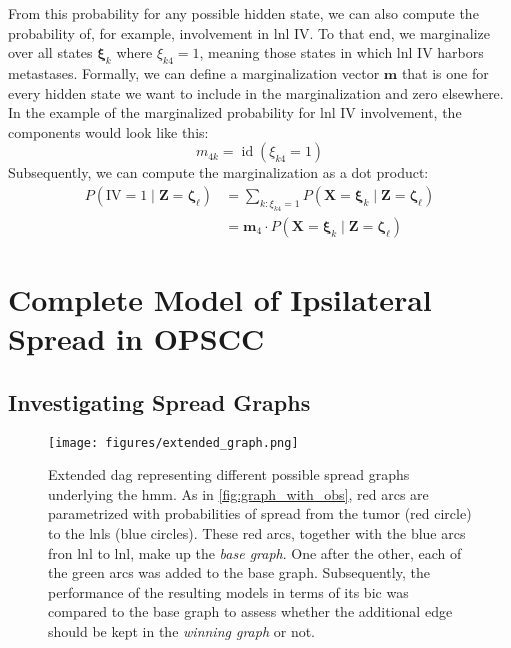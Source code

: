 \documentclass[twocolumn]{aastex631}
\begin{document}
From this probability for any possible hidden state, we can also compute the probability of, for example, involvement in \gls{lnl} IV. To that end, we marginalize over all states $\boldsymbol{\xi}_k$ where $\xi_{k4} = 1$, meaning those states in which \gls{lnl} IV harbors metastases. Formally, we can define a marginalization vector $\mathbf{m}$ that is one for every hidden state we want to include in the marginalization and zero elsewhere. In the example of the marginalized probability for \gls{lnl} IV involvement, the components would look like this:
%
\begin{equation}
    m_{4k} = \operatorname{id}(\xi_{k4} = 1)
\end{equation}
%
Subsequently, we can compute the marginalization as a dot product:
%
\begin{equation}
    \begin{aligned}
        P\left(\text{IV} = 1 \mid \mathbf{Z}=\boldsymbol{\zeta}_\ell \right) &= \sum_{k:\xi_{k4} = 1} P\left( \mathbf{X}=\boldsymbol{\xi}_k \mid \mathbf{Z}=\boldsymbol{\zeta}_\ell \right) \\
        &= \mathbf{m}_4 \cdot P\left( \mathbf{X}=\boldsymbol{\xi}_k \mid \mathbf{Z}=\boldsymbol{\zeta}_\ell \right)
    \end{aligned}
\end{equation}


\section{Complete Model of Ipsilateral Spread in OPSCC}
\label{sec:complete_model}


\subsection{Investigating Spread Graphs}
\label{subsec:complete_model:graphs}

\begin{figure}
    \centering
    \texttt{[image: figures/extended\_graph.png]}
    \caption{Extended \gls{dag} representing different possible spread graphs underlying the \gls{hmm}. As in \autoref{fig:graph_with_obs}, red arcs are parametrized with probabilities of spread from the tumor (red circle) to the \glspl{lnl} (blue circles). These red arcs, together with the blue arcs fron \gls{lnl} to \gls{lnl}, make up the \emph{base graph}. One after the other, each of the green arcs was added to the base graph. Subsequently, the performance of the resulting models in terms of its \gls{bic} was compared to the base graph to assess whether the additional edge should be kept in the \emph{winning graph} or not. \label{fig:extended_graph}}
\end{figure}
\end{document}
